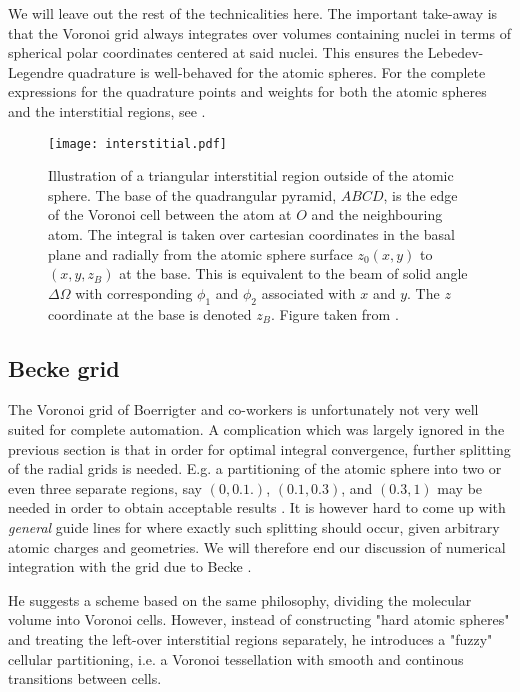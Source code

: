 \documentclass[a4paper]{article}
\begin{document}
We will leave out the rest of the technicalities here. The important take-away is that the Voronoi grid always integrates over volumes containing nuclei in terms of spherical polar coordinates centered at said nuclei. This ensures the Lebedev-Legendre quadrature is well-behaved for the atomic spheres. For the complete expressions for the quadrature points and weights for both the atomic spheres and the interstitial regions, see \cite{voronoi2}.

\begin{SCfigure}
\centering
\texttt{[image: interstitial.pdf]}
\caption{Illustration of a triangular interstitial region outside of the atomic sphere. The base of the quadrangular pyramid, $ABCD$, is the edge of the Voronoi cell between the atom at $O$ and the neighbouring atom. The integral is taken over cartesian coordinates in the basal plane and radially from the atomic sphere surface $z_0(x,y)$ to $(x,y,z_B)$ at the base. This is equivalent to the beam of solid angle $\Delta \Omega$ with corresponding $\phi_1$ and $\phi_2$ associated with $x$ and $y$. The $z$ coordinate at the base is denoted $z_B$.  Figure taken from \cite{voronoi2}.\label{fig:dft4}}
\end{SCfigure}

\subsection{Becke grid}
The Voronoi grid of Boerrigter and co-workers is unfortunately not very well suited for complete automation. A complication which was largely ignored in the previous section is that in order for optimal integral convergence, further splitting of the radial grids is needed. E.g. a partitioning of the atomic sphere into two or even three separate regions, say $(0,0.1.)$, $(0.1,0.3)$, and $(0.3,1)$ may be needed in order to obtain acceptable results \cite{voronoi1}. It is however hard to come up with \emph{general} guide lines for where exactly such splitting should occur, given arbitrary atomic charges and geometries. We will therefore end our discussion of numerical integration with the grid due to Becke \cite{beckegrid}.

He suggests a scheme based on the same philosophy, dividing the molecular volume into Voronoi cells. However, instead of constructing "hard atomic spheres" and treating the left-over interstitial regions separately, he introduces a "fuzzy" cellular partitioning, i.e. a Voronoi tessellation with smooth and continous transitions between cells. 
\end{document}
